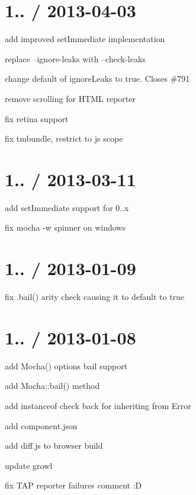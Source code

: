 \section*{1.. / 2013-\/04-\/03}


\begin{DoxyItemize}
\item add improved set\+Immediate implementation
\item replace --ignore-\/leaks with --check-\/leaks
\item change default of ignore\+Leaks to true. Closes \#791
\item remove scrolling for H\+T\+ML reporter
\item fix retina support
\item fix tmbundle, restrict to js scope
\end{DoxyItemize}

\section*{1.. / 2013-\/03-\/11}


\begin{DoxyItemize}
\item add {\ttfamily set\+Immediate} support for 0..\+x
\item fix mocha -\/w spinner on windows
\end{DoxyItemize}

\section*{1.. / 2013-\/01-\/09}


\begin{DoxyItemize}
\item fix .bail() arity check causing it to default to true
\end{DoxyItemize}

\section*{1.. / 2013-\/01-\/08}


\begin{DoxyItemize}
\item add Mocha() options bail support
\item add {\ttfamily Mocha\+::bail()} method
\item add instanceof check back for inheriting from Error
\item add component.\+json
\item add diff.\+js to browser build
\item update growl
\item fix T\+AP reporter failures comment \+:D
\end{DoxyItemize}

